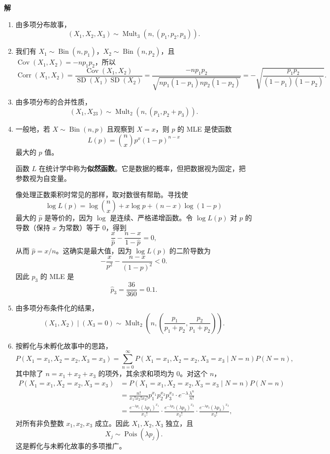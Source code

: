 \documentclass[UTF8, 12pt, fontset=fandol, oneside]{ctexart}
\begin{document}
\noindent\textbf{解}\quad
\begin{enumerate}
  \item[(a)] 由多项分布故事，
  \[
    (X_1,X_2,X_3)\sim \operatorname{Mult}_3(n,(p_1,p_2,p_3)).
  \]
  \item[(b)] 我们有 $X_1\sim \operatorname{Bin}(n,p_1)$，$X_2\sim \operatorname{Bin}(n,p_2)$，且 $\operatorname{Cov}(X_1,X_2)=-np_1p_2$，所以
  \[
    \operatorname{Corr}(X_1,X_2)
    =\frac{\operatorname{Cov}(X_1,X_2)}{\operatorname{SD}(X_1)\operatorname{SD}(X_2)}
    =\frac{-np_1p_2}{\sqrt{np_1(1-p_1)np_2(1-p_2)}}
    =-\sqrt{\frac{p_1p_2}{(1-p_1)(1-p_2)}}.
  \]
  \item[(c)] 由多项分布的合并性质，
  \[
    (X_1,X_{23})\sim \operatorname{Mult}_2(n,(p_1,p_2+p_3)).
  \]
  \item[(d)] 一般地，若 $X\sim \operatorname{Bin}(n,p)$ 且观察到 $X=x$，则 $p$ 的 MLE 是使函数
  \[
    L(p)={n\choose x}p^x(1-p)^{n-x}
  \]
  最大的 $p$ 值。

  函数 $L$ 在统计学中称为\textbf{似然函数}。它是数据的概率，但把数据视为固定，把参数视为自变量。

  像处理正数乘积时常见的那样，取对数很有帮助。寻找使
  \[
    \log L(p)=\log {n\choose x}+x\log p+(n-x)\log(1-p)
  \]
  最大的 $\hat p$ 是等价的，因为 $\log$ 是连续、严格递增函数。令 $\log L(p)$ 对 $p$ 的导数（保持 $x$ 为常数）等于 $0$，得到
  \[
    \frac{x}{\hat p}-\frac{n-x}{1-\hat p}=0,
  \]
  从而 $\hat p=x/n$。这确实是最大值，因为 $\log L(p)$ 的二阶导数为
  \[
    -\frac{x}{p^2}-\frac{n-x}{(1-p)^2}<0.
  \]
  因此 $p_3$ 的 MLE 是
  \[
    \hat p_3=\frac{36}{360}=0.1.
  \]
  \item[(e)] 由多项分布条件化的结果，
  \[
    (X_1,X_2)\mid (X_3=0)
    \sim \operatorname{Mult}_2\left(n,\left(\frac{p_1}{p_1+p_2},\frac{p_2}{p_1+p_2}\right)\right).
  \]
  \item[(f)] 按孵化与未孵化故事中的思路，
  \[
    P(X_1=x_1,X_2=x_2,X_3=x_3)
    =\sum_{n=0}^{\infty}
    P(X_1=x_1,X_2=x_2,X_3=x_3\mid N=n)P(N=n),
  \]
  其中除了 $n=x_1+x_2+x_3$ 的项外，其余求和项均为 $0$。对这个 $n$，
  \[
  \begin{aligned}
    P(X_1=x_1,X_2=x_2,X_3=x_3)
    &=P(X_1=x_1,X_2=x_2,X_3=x_3\mid N=n)P(N=n)\\
    &=\frac{n!}{x_1!x_2!x_3!}p_1^{x_1}p_2^{x_2}p_3^{x_3}\cdot e^{-\lambda}\frac{\lambda^n}{n!}\\
    &=\frac{e^{-\lambda p_1}(\lambda p_1)^{x_1}}{x_1!}
      \cdot \frac{e^{-\lambda p_2}(\lambda p_2)^{x_2}}{x_2!}
      \cdot \frac{e^{-\lambda p_3}(\lambda p_3)^{x_3}}{x_3!},
  \end{aligned}
  \]
  对所有非负整数 $x_1,x_2,x_3$ 成立。因此 $X_1,X_2,X_3$ 独立，且
  \[
    X_j\sim \operatorname{Pois}(\lambda p_j).
  \]
  这是孵化与未孵化故事的多项推广。
\end{enumerate}
\end{document}
